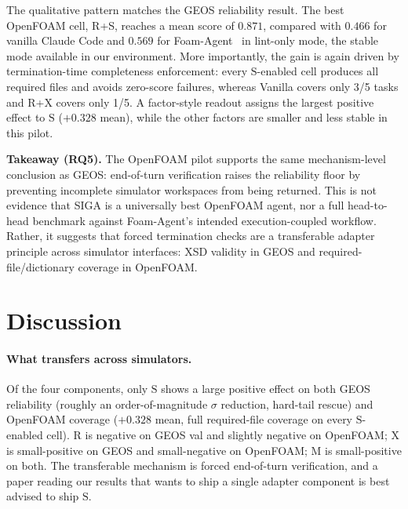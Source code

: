 \documentclass{article}
\begin{document}
The qualitative pattern matches the GEOS reliability result. 
The best OpenFOAM cell, R+S, reaches a mean score of $0.871$, compared with $0.466$ for vanilla Claude Code and $0.569$ for Foam-Agent~\citep{foamagent2025} in lint-only mode, the stable mode available in our environment. 
More importantly, the gain is again driven by termination-time completeness enforcement: every $\mathrm{S}$-enabled cell produces all required files and avoids zero-score failures, whereas Vanilla covers only 3/5 tasks and R+X covers only 1/5. 
A factor-style readout assigns the largest positive effect to $\mathrm{S}$ ($+0.328$ mean), while the other factors are smaller and less stable in this pilot.

\textbf{Takeaway (RQ5).} 
The OpenFOAM pilot supports the same mechanism-level conclusion as GEOS: end-of-turn verification raises the reliability floor by preventing incomplete simulator workspaces from being returned. 
This is not evidence that SIGA is a universally best OpenFOAM agent, nor a full head-to-head benchmark against Foam-Agent's intended execution-coupled workflow. 
Rather, it suggests that forced termination checks are a transferable adapter principle across simulator interfaces: XSD validity in GEOS and required-file/dictionary coverage in OpenFOAM.


\section{Discussion}
\label{sec:discussion}
\label{sec:analysis}
\label{subsec:limitations}

\paragraph{What transfers across simulators.} Of the four components, only $\mathrm{S}$ shows a large positive effect on both GEOS reliability (roughly an order-of-magnitude $\sigma$ reduction, hard-tail rescue) and OpenFOAM coverage ($+0.328$ mean, full required-file coverage on every $\mathrm{S}$-enabled cell). $\mathrm{R}$ is negative on GEOS val and slightly negative on OpenFOAM; $\mathrm{X}$ is small-positive on GEOS and small-negative on OpenFOAM; $\mathrm{M}$ is small-positive on both. The transferable mechanism is forced end-of-turn verification, and a paper reading our results that wants to ship a single adapter component is best advised to ship $\mathrm{S}$.
\end{document}
